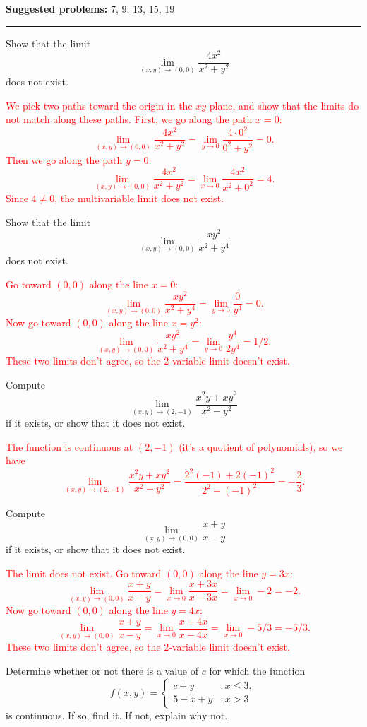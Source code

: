 \documentclass[12pt,reqno]{amsart}
\begin{document}
\textbf{Suggested problems:} 7, 9, 13, 15, 19

\bigskip
\hrule

\bigskip

\prob Show that the limit
	\[\lim_{(x,y) \to (0,0)} \frac{4x^2}{x^2+y^2}
	\]
does not exist.

\bigskip
\textcolor{red}{We pick two paths toward the origin in the $xy$-plane, and show that the limits do not match along these paths. First, we go along the path $x=0$:
	\[\lim_{(x,y) \to (0,0)} \frac{4x^2}{x^2+y^2} = \lim_{y \to 0} \frac{4\cdot0^2}{0^2+y^2} = 0.
	\]
Then we go along the path $y=0$:
	\[\lim_{(x,y) \to (0,0)} \frac{4x^2}{x^2+y^2} = \lim_{x \to 0} \frac{4x^2}{x^2+0^2} = 4.
	\]
Since $4\neq 0$, the multivariable limit does not exist.}
\bigskip

\prob Show that the limit
	\[\lim_{(x,y)\to (0,0)} \frac{ xy^2}{x^2+y^4}
	\]
does not exist.

\bigskip
\textcolor{red}{Go toward $(0,0)$ along the line $x=0$:
	\[\lim_{(x,y)\to(0,0)} \frac{xy^2}{x^2+y^4} = \lim_{y\to 0} \frac{0}{y^4} = 0.
	\]
Now go toward $(0,0)$ along the line $x=y^2$:
	\[\lim_{(x,y)\to(0,0)} \frac{xy^2}{x^2+y^4} = \lim_{y\to 0} \frac{y^4}{2y^4} = 1/2.
	\]
These two limits don't agree, so the $2$-variable limit doesn't exist.}

\bigskip
\prob Compute
	\[\lim_{(x,y) \to (2,-1)} \frac{x^2y+xy^2}{x^2-y^2}
	\]
if it exists, or show that it does not exist.

\bigskip
\textcolor{red}{The function is continuous at $(2,-1)$ (it's a quotient of polynomials), so we have
	\[\lim_{(x,y) \to (2,-1)} \frac{x^2y+xy^2}{x^2-y^2} = \frac{2^2(-1)+2(-1)^2}{2^2-(-1)^2} = -\frac{2}{3}.
	\]}
\bigskip

\prob Compute
	\[\lim_{(x,y)\to(0,0)} \frac{x+y}{x-y}
	\]
if it exists, or show that it does not exist.

\bigskip
\textcolor{red}{The limit does not exist. Go toward $(0,0)$ along the line $y=3x$:
	\[\lim_{(x,y)\to(0,0)} \frac{x+y}{x-y} = \lim_{x\to 0} \frac{x+3x}{x-3x} = \lim_{x\to 0} -2 = -2.
	\]
Now go toward $(0,0)$ along the line $y=4x$:
	\[\lim_{(x,y)\to(0,0)} \frac{x+y}{x-y} = \lim_{x\to 0} \frac{x+4x}{x-4x} = \lim_{x\to 0} -5/3 = -5/3.
	\]
These two limits don't agree, so the $2$-variable limit doesn't exist.}

\bigskip
\prob Determine whether or not there is a value of $c$ for which the function
	\[f(x,y) = \begin{cases}
	c+y & : x\leq 3, \\
	5-x+y & : x>3
	\end{cases}
	\]
is continuous. If so, find it. If not, explain why not.
\end{document}
